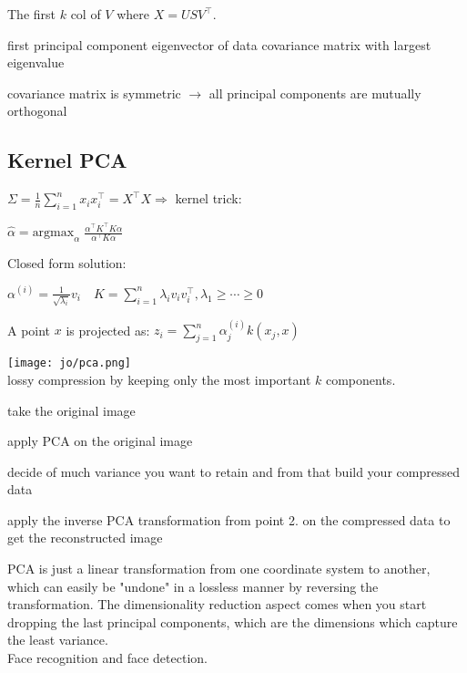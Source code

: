 \begin{compactitem}
	\item The first $k$ col of $V$ where $X = U S V^\top$.
	\item first principal component eigenvector of data covariance matrix with largest eigenvalue
	\item covariance matrix is symmetric $\rightarrow$ all principal components are mutually orthogonal
\end{compactitem}	


\subsection*{Kernel PCA}

$\Sigma = \frac{1}{n} \sum_{i=1}^n x_i x_i^\top = X^\top X \Rightarrow$  kernel trick:

\qquad \qquad $\hat{\alpha} = \text{argmax}_\alpha \; \frac{\alpha^\top K^\top K \alpha}{\alpha^\top K \alpha}$

Closed form solution:

$\alpha^{(i)} = \frac{1}{\sqrt{\lambda_i}}v_i \quad K = \sum_{i = 1}^n \lambda_i v_i v_i^\top, \lambda_1 \geq \cdots \geq 0$

A point $x$ is projected as:
$z_i = \sum_{j=1}^n \alpha_j^{(i)} k(x_j, x)$

\texttt{[image: jo/pca.png]}\\
 lossy compression by keeping only the most important $k$ components.
\begin{compactitem}
\item take the original image
\item apply PCA on the original image
\item decide of much variance you want to retain and from that build your compressed data
\item apply the inverse PCA 
transformation from point 2. on the compressed data to get the reconstructed image

\end{compactitem}
PCA is just a linear transformation from one coordinate system to another, which can easily be "undone" in a lossless manner by reversing the transformation. The dimensionality reduction aspect comes when you start dropping the last principal components, which are the dimensions which capture the least variance.\\
Face recognition  and face detection.
